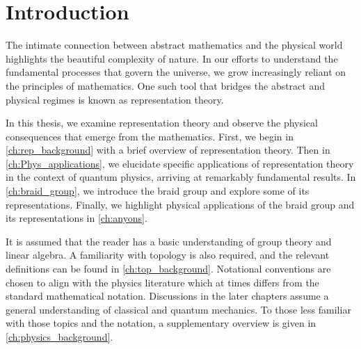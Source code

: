 \chapter{Introduction}\label{ch:introduction}

The intimate connection between abstract mathematics and the physical world highlights the beautiful complexity of nature. In our efforts to understand the fundamental processes that govern the universe, we grow increasingly reliant on the principles of mathematics. One such tool that bridges the abstract and physical regimes is known as representation theory.

In this thesis, we examine representation theory and observe the physical consequences that emerge from the mathematics. First, we begin in \cref{ch:rep_background} with a brief overview of representation theory. Then in \cref{ch:Phys_applications}, we elucidate specific applications of representation theory in the context of quantum physics, arriving at remarkably fundamental results. In \cref{ch:braid_group}, we introduce the braid group and explore some of its representations. Finally, we highlight physical applications of the braid group and its representations in \cref{ch:anyons}.

It is assumed that the reader has a basic understanding of group theory and linear algebra. A familiarity with topology is also required, and the relevant definitions can be found in \cref{ch:top_background}. Notational conventions are chosen to align with the physics literature which at times differs from the standard mathematical notation. Discussions in the later chapters assume a general understanding of classical and quantum mechanics. To those less familiar with those topics and the notation, a supplementary overview is given in \cref{ch:physics_background}.